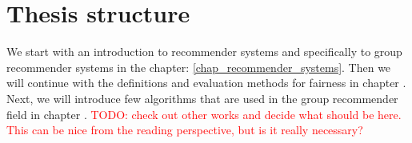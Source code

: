 \section{Thesis structure}

We start with an introduction to recommender systems and specifically to group recommender systems in the chapter: \ref{chap_recommender_systems}. Then we will continue with the definitions and evaluation methods for fairness in chapter . Next, we will introduce few algorithms that are used in the group recommender field in chapter .
\textcolor{red}{TODO: check out other works and decide what should be here. This can be nice from the reading perspective, but is it really necessary?}


